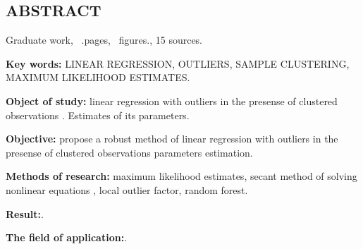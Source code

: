 \newpage

\begin{center}
    \section*{ABSTRACT}
\end{center}

Graduate work, ~.pages, ~figures., 15 sources.

\textbf{Key words:} LINEAR REGRESSION, OUTLIERS, SAMPLE CLUSTERING, MAXIMUM LIKELIHOOD ESTIMATES.

\textbf{Object of study:} linear regression with outliers in the presense of clustered observations . Estimates of its parameters.

\textbf{Objective:} propose a robust method of linear regression with outliers in the presense of clustered observations parameters estimation.

\textbf{Methods of research:} maximum likelihood estimates, secant method of solving nonlinear equations , local outlier factor, random forest.

\textbf{Result:}.

\textbf{The field of application:}.